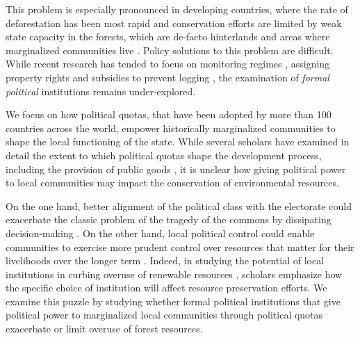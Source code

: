 \documentclass[12pt,reqno]{article}
\begin{document}
This problem is especially pronounced in developing countries, where the rate of deforestation has been most rapid and conservation efforts are limited by weak state capacity in the forests, which are de-facto hinterlands and areas where marginalized communities live \parencite{burgess2019brazilian}. Policy solutions to this problem are difficult. While recent research has tended to focus on monitoring regimes \parencite{anderson2019non,buntaine2020combining}, assigning property rights \parencite{buntaine2015titling,baragwanath2020collective} and subsidies to prevent logging \parencite{jayachandran2017cash}, the examination of \emph{formal political} institutions remains under-explored.

We focus on how political quotas, that have been adopted by more than 100 countries across the world, empower historically marginalized communities to shape the local functioning of the state. While several scholars have examined in detail the extent to which political quotas shape the development process, including the provision of public goods \parencite{jensenius2017social,gulzar2019}, it is unclear how giving political power to local communities may impact the conservation of environmental resources. 

On the one hand, better alignment of the political class with the electorate could exacerbate the classic problem of the tragedy of the commons by dissipating decision-making \parencite{hardin1968tragedy}. On the other hand, local political control could enable communities to exercise more prudent control over resources that matter for their livelihoods over the longer term \parencite{ostrom1990governing}. Indeed, in studying the potential of local institutions in curbing overuse of renewable resources \parencite{ostrom1990governing,dasgupta1995inquiry, Lemos2006-tq,Dietz2003-bs}, scholars emphasize how the specific choice of institution will affect resource preservation efforts. We examine this puzzle by studying whether formal political institutions that give political power to marginalized local communities through political quotas exacerbate or limit overuse of forest resources.
\end{document}
